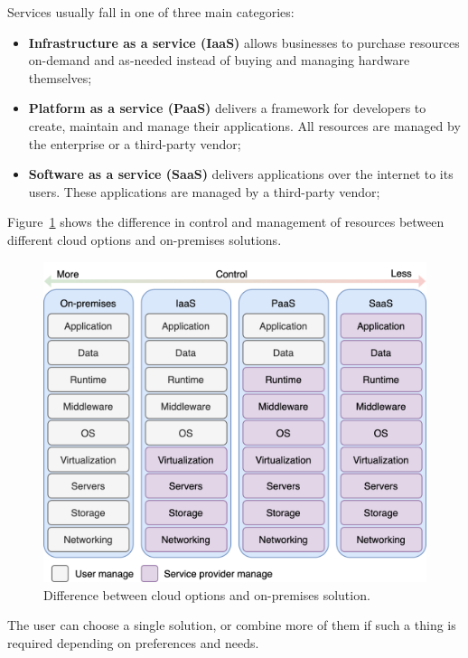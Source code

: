 Services usually fall in one of three main categories: 

\begin{itemize}
	\item \textbf{Infrastructure as a service (IaaS)} allows businesses to purchase resources on-demand and as-needed instead of buying and managing hardware themselves;
	\item \textbf{Platform as a service (PaaS)} delivers a framework for developers to create, maintain and manage their applications. All resources are managed by the enterprise or a third-party vendor;
	\item \textbf{Software as a service (SaaS)} delivers applications over the internet to its users. These applications are managed by a third-party vendor;
\end{itemize}

\noindent
Figure~\ref{fig:fig1} shows the difference in control and management of resources between different cloud options and on-premises solutions.

\begin{figure}[H]
	\begin{center}
		\includegraphics[scale=0.75]{images/Figure1.png}
	\end{center}
	\vspace{-0.6cm}
	\caption{Difference between cloud options and on-premises solution.}
	\label{fig:fig1}
\end{figure}

\noindent
The user can choose a single solution, or combine more of them if such a thing is required depending on preferences and needs.

